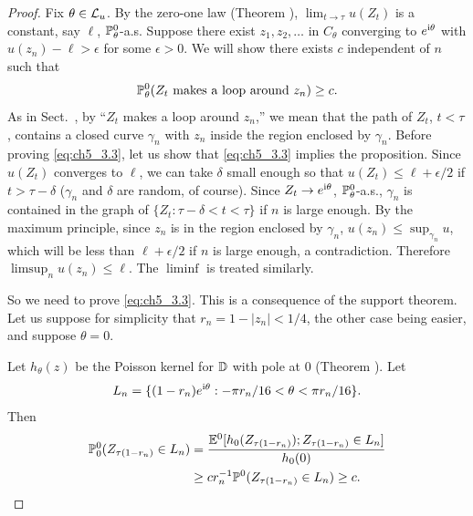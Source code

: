 \begin{proof}
Fix $\theta \in \LC_u$. By the zero-one law (Theorem ), $\lim_{t\to\tau} u(Z_t)$ is a constant, say $\ell$, $\P_\theta^0$-a.s. Suppose there exist $z_1,z_2,\dots$ in $C_\theta$ converging to $e^{\im\theta}$ with $u(z_n) - \ell > \epsilon$ for some $\epsilon > 0$. We will show there exists $c$ independent of $n$ such that
\begin{equation}\label{eq:ch5_3.3}
    \P_\theta^0(Z_t~\text{makes a loop around}~z_n) \geq c.
\end{equation}
As in Sect.\ , by ``$Z_t$ makes a loop around $z_n$,'' we mean that the path of $Z_t$, $t < \tau$, contains a closed curve $\gamma_n$ with $z_n$ inside the region enclosed by $\gamma_n$. Before proving \eqref{eq:ch5_3.3}, let us show that \eqref{eq:ch5_3.3} implies the proposition. Since $u(Z_t)$ converges to $\ell$, we can take $\delta$ small enough so that $u(Z_t) \leq \ell + \epsilon/2$ if $t > \tau - \delta$ ($\gamma_n$ and $\delta$ are random, of course). Since $Z_t \to e^{\im\theta}$, $\P_\theta^0$-a.s., $\gamma_n$ is contained in the graph of $\{Z_t : \tau - \delta < t < \tau\}$ if $n$ is large enough. By the maximum principle, since $z_n$ is in the region enclosed by $\gamma_n$, $u(z_n) \leq \sup_{\gamma_n} u$, which will be less than $\ell + \epsilon/2$ if $n$ is large enough, a contradiction. Therefore $\limsup_n u(z_n) \leq \ell$. The $\liminf$ is treated similarly.

So we need to prove \eqref{eq:ch5_3.3}. This is a consequence of the support theorem. Let us suppose for simplicity that $r_n = 1 - |z_n| < 1/4$, the other case being easier, and suppose $\theta = 0$.

Let $h_\theta(z)$ be the Poisson kernel for $\D$ with pole at $0$ (Theorem ). Let
\[
    L_n = \{(1 - r_n)e^{\im\theta} : -\pi r_n/16 < \theta < \pi r_n/16\}.
\]
Then
\begin{align}\label{eq:ch5_3.4}
    \P_0^0(Z_{\tau(1-r_n)} \in L_n) &= \frac{\E^0[h_0(Z_{\tau(1-r_n)}); Z_{\tau(1-r_n)} \in L_n]}{h_0(0)} \\
    &\geq cr_n^{-1}\P^0(Z_{\tau(1-r_n)} \in L_n) \geq c. \notag
\end{align}


\end{proof}
